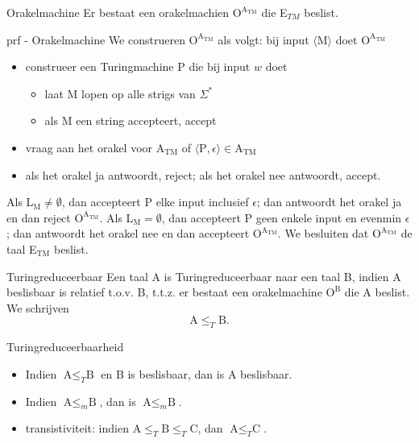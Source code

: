 \vspace{0.5cm}

\begin{lem}[Orakelmachine]{Orakelmachine}
    Er bestaat een orakelmachien $\text{O}^{\text{A}_{\text{TM}}}$ die E$_{TM}$ beslist.
\end{lem}

\begin{prf}[Orakelmachine]{prf - Orakelmachine}
    We construeren $\text{O}^{\text{A}_{\text{TM}}}$  als volgt: bij input $\langle \text{M} \rangle$ doet $\text{O}^{\text{A}_{\text{TM}}}$
    \begin{itemize}
        \item construeer een Turingmachine P die bij input $w$ doet
        \begin{itemize}
            \item laat M lopen op alle strigs van $\Sigma^*$ 
            \item als M een string accepteert, accept
        \end{itemize}
        \item vraag aan het orakel voor A$_{\text{TM}}$ of $\langle \text{P}, \epsilon \rangle \in \text{A}_{\text{TM}}$
        \item als het orakel ja antwoordt, reject; als het orakel nee antwoordt, accept.
    \end{itemize}
    Als L$_{\text{M}}  \neq  \emptyset$, dan accepteert P elke input inclusief $\epsilon$; dan antwoordt het orakel ja en dan reject $\text{O}^{\text{A}_{\text{TM}}}$. Als L$_{\text{M}} = \emptyset$, dan accepteert P geen enkele input en evenmin $\epsilon$; dan antwoordt het orakel nee en dan accepteert $\text{O}^{\text{A}_{\text{TM}}}$. We besluiten dat $\text{O}^{\text{A}_{\text{TM}}}$ de taal E$_{\text{TM}}$ beslist.
\end{prf}

\begin{theo}[Turingreduceerbaar]{Turingreduceerbaar}
    Een taal A is Turingreduceerbaar naar een taal B, indien A beslisbaar is relatief t\@.o\@.v\@. B,  t\@.t\@.z\@. er bestaat een orakelmachine $\text{O}^{\text{B}}$ die A beslist. We schrijven 
    \begin{equation*}
        \text{A} \leq_T \text{B}.
    \end{equation*}
    \vspace{-0.5cm}
\end{theo}

\begin{lem}[Turingreduceerbaarheid]{Turingreduceerbaarheid}
    \begin{itemize}
        \item Indien $\text{A} \leq_T \text{B}$ en B is beslisbaar, dan is A beslisbaar.
        \item Indien $\text{A} \leq_m \text{B}$, dan is $\text{A} \leq_m \text{B}$.
        \item transistiviteit: indien $\text{A} \leq_T \text{B} \leq_T \text{C}$, dan $\text{A} \leq_T \text{C}$.
    \end{itemize}
\end{lem}

